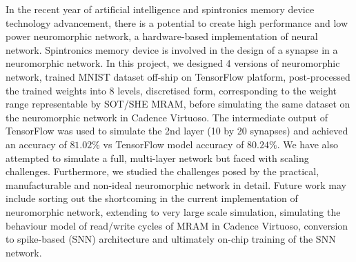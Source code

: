In the recent year of artificial intelligence and spintronics memory device technology advancement, there is a potential to create high performance and low power neuromorphic network, a hardware-based implementation of neural network. Spintronics memory device is involved in the design of a synapse in a neuromorphic network. In this project, we designed 4 versions of neuromorphic network, trained MNIST dataset off-ship on TensorFlow platform, post-processed the trained weights into 8 levels, discretised form, corresponding to the weight range representable by SOT/SHE MRAM, before simulating the same dataset on the neuromorphic network in Cadence Virtuoso. The intermediate output of TensorFlow was used to simulate the 2nd layer (10 by 20 synapses) and achieved an accuracy of $81.02\%$ vs TensorFlow model accuracy of $80.24\%$. We have also attempted to simulate a full, multi-layer network but faced with scaling challenges. Furthermore, we studied the challenges posed by the practical, manufacturable and non-ideal neuromorphic network in detail. Future work may include sorting out the shortcoming in the current implementation of neuromorphic network, extending to very large scale simulation, simulating the behaviour model of read/write cycles of MRAM in Cadence Virtuoso, conversion to spike-based (SNN) architecture and ultimately on-chip training of the SNN network.